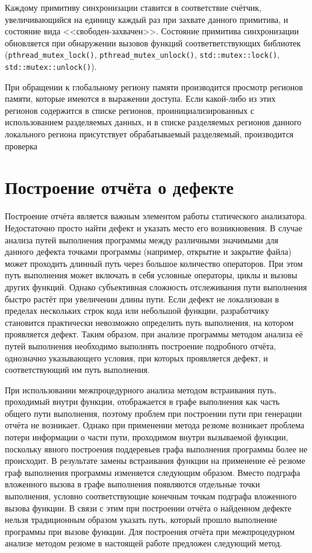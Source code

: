 Каждому примитиву синхронизации ставится в соответствие счётчик, увеличивающийся на единицу каждый раз при захвате данного примитива, и состояние вида <<свободен-захвачен>>. Состояние примитива синхронизации обновляется при обнаружении вызовов функций соответветствующих библиотек (\texttt{pthread\_mutex\_lock()}, \texttt{pthread\_mutex\_unlock()}, \texttt{std::mutex::lock()}, \texttt{std::mutex::unlock()}).

При обращении к глобальному региону памяти производится просмотр регионов памяти, которые имеются в выражении доступа. Если какой-либо из этих регионов содержится в списке регионов, проинициализированных с использованием разделяемых данных, и в списке разделяемых регионов данного локального региона присутствует обрабатываемый разделяемый, производится проверка 

\section{Построение отчёта о дефекте}

Построение отчёта является важным элементом работы статического анализатора. Недостаточно просто найти дефект и указать место его возникновения. В случае анализа путей выполнения программы между различными значимыми для данного дефекта точками программы (например, открытие и закрытие файла) может проходить длинный путь через большое количество операторов. При этом путь выполнения может включать в себя условные операторы, циклы и вызовы других функций. Однако субъективная сложность отслеживания пути выполнения быстро растёт при увеличении длины пути. Если дефект не локализован в пределах нескольких строк кода или небольшой функции, разработчику становится практически невозможно определить путь выполнения, на котором проявляется дефект. Таким образом, при анализе программы методом анализа её путей выполнения необходимо выполнять построение подробного отчёта, однозначно указывающего условия, при которых проявляется дефект, и соответствующий им путь выполнения.

При использовании межпроцедурного анализа методом встраивания путь, проходимый внутри функции, отображается в графе выполнения как часть общего пути выполнения, поэтому проблем при построении пути при генерации отчёта не возникает. Однако при применении метода резюме возникает проблема потери информации о части пути, проходимом внутри вызываемой функции, поскольку явного построения поддеревьев графа выполнения программы более не происходит. В результате замены встраивания функции на применение её резюме граф выполнения программы изменяется следующим образом. Вместо подграфа вложенного вызова в графе выполнения появляются отдельные точки выполнения, условно соответствующие конечным точкам подграфа вложенного вызова функции. В связи с этим при построении отчёта о найденном дефекте нельзя традиционным образом указать путь, который прошло выполнение программы при вызове функции. Для построения отчёта  при межпроцедурном анализе методом резюме в настоящей работе предложен следующий метод.

